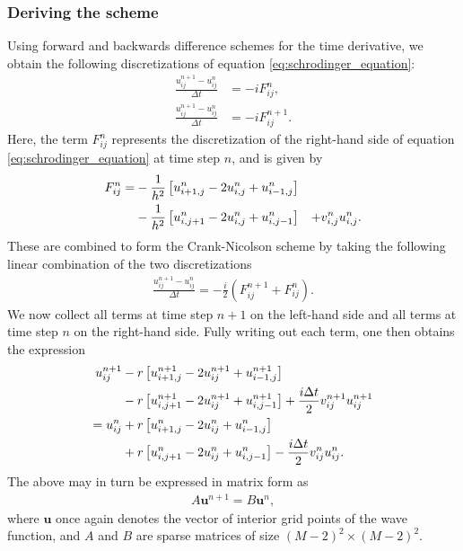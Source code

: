 \documentclass[aps,pra,reprint,amsmath,amssymb,twocolumn,preprintnumbers,superscriptaddress,10pt]{revtex4-2}
\renewcommand{\vec}[1]{\mathbf{#1}}
\begin{document}
\subsubsection{Deriving the scheme}
Using forward and backwards difference schemes for the time derivative, we obtain the following discretizations of equation \eqref{eq:schrodinger_equation}:
\begin{align}
    \frac{u_{ij}^{n+1} - u_{ij}^n}{\Delta t} &= -i F_{ij}^{n},
    \\
    \frac{u_{ij}^{n+1} - u_{ij}^n}{\Delta t} &= -i F_{ij}^{n+1}.
\end{align}
Here, the term $F_{ij}^n$ represents the discretization of the right-hand side of equation \eqref{eq:schrodinger_equation} at time step $n$, and is given by
\begin{align}
    F_{ij}^n
    = 
    &-\frac{1}{h^2} \left[ u_{i+1,j}^n - 2u_{i,j}^n + u_{i-1,j}^n\right] 
    \notag \\
    &-\frac{1}{h^2} \left[ u_{i,j+1}^n - 2u_{i,j}^n + u_{i,j-1}^n\right]
    &+ v_{i,j}^n u_{i,j}^n.
\end{align}
These are combined to form the Crank-Nicolson scheme by taking the following linear combination of the two discretizations
\begin{align}\label{eq:crank_nicolson}
    \frac{u_{ij}^{n+1} - u_{ij}^n}{\Delta t} 
    = 
    -\frac{i}{2} \left( F_{ij}^{n+1} + F_{ij}^{n} \right).
\end{align}
We now collect all terms at time step $n+1$ on the left-hand side and all terms at time step $n$ on the right-hand side.
Fully writing out each term, one then obtains the expression
\begin{align}\label{eq:update_rule}
    u_{ij}^{n+1} 
    &- r \left[ u_{i+1,j}^{n+1} - 2u_{ij}^{n+1} + u_{i-1,j}^{n+1} \right]
    \notag \\
    &- r \left[ u_{i,j+1}^{n+1} - 2u_{ij}^{n+1} + u_{i,j-1}^{n+1} \right]
    + \frac{i \Delta t}{2} v_{ij}^{n+1} u_{ij}^{n+1}
    \notag \\
    =
    u_{ij}^{n}
    &+ r \left[ u_{i+1,j}^{n} - 2u_{ij}^{n} + u_{i-1,j}^{n} \right]
    \notag \\
    &+ r \left[ u_{i,j+1}^{n} - 2u_{ij}^{n} + u_{i,j-1}^{n} \right]
    - \frac{i \Delta t}{2} v_{ij}^n u_{ij}^n.
\end{align}
The above may in turn be expressed in matrix form as
\begin{align}
    A \vec{u}^{n+1} = B \vec{u}^{n},    \label{eq:A_B_eq}
\end{align}
where $\vec{u}$ once again denotes the vector of interior grid points of the wave function, and $A$ and $B$ are sparse matrices of size $(M-2)^2 \times (M-2)^2$.
\end{document}
